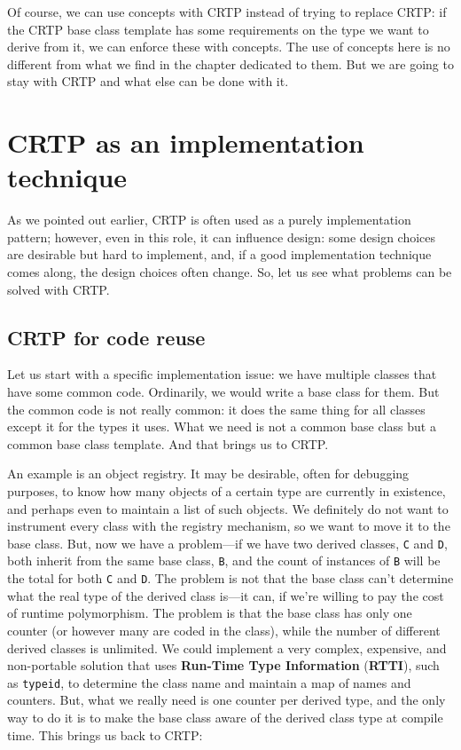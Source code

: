 Of course, we can use concepts with CRTP instead of trying to replace CRTP: if the CRTP base class template has some requirements on the type we want to derive from it, we can enforce these with concepts. The use of concepts here is no different from what we find in the chapter dedicated to them. But we are going to stay with CRTP and what else can be done with it.

\section{CRTP as an implementation technique}

As we pointed out earlier, CRTP is often used as a purely implementation pattern; however, even in this role, it can influence design: some design choices are desirable but hard to implement, and, if a good implementation technique comes along, the design choices often change. So, let us see what problems can be solved with CRTP.

\subsection{CRTP for code reuse}

Let us start with a specific implementation issue: we have multiple classes that have some common code. Ordinarily, we would write a base class for them. But the common code is not really common: it does the same thing for all classes except it for the types it uses. What we need is not a common base class but a common base class template. And that brings us to CRTP.

An example is an object registry. It may be desirable, often for debugging purposes, to know how many objects of a certain type are currently in existence, and perhaps even to maintain a list of such objects. We definitely do not want to instrument every class with the registry mechanism, so we want to move it to the base class. But, now we have a problem---if we have two derived classes, \texttt{C} and \texttt{D}, both inherit from the same base class, \texttt{B}, and the count of instances of \texttt{B} will be the total for both \texttt{C} and \texttt{D}. The problem is not that the base class can't determine what the real type of the derived class is---it can, if we're willing to pay the cost of runtime polymorphism. The problem is that the base class has only one counter (or however many are coded in the class), while the number of different derived classes is unlimited. We could implement a very complex, expensive, and non-portable solution that uses \textbf{Run-Time Type Information} (\textbf{RTTI}), such as \texttt{typeid}, to determine the class name and maintain a map of names and counters. But, what we really need is one counter per derived type, and the only way to do it is to make the base class aware of the derived class type at compile time. This brings us back to CRTP:


